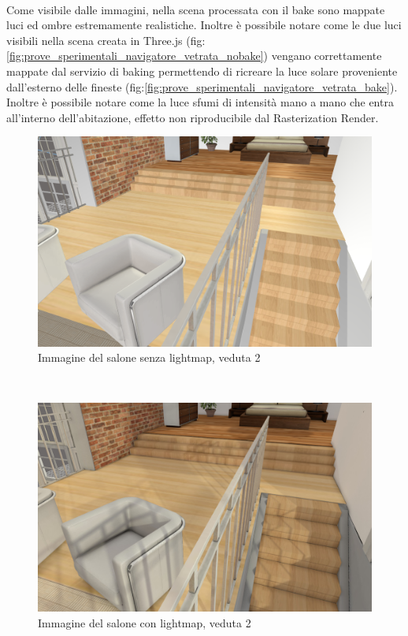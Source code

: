 \\
Come visibile dalle immagini, nella scena processata con il bake sono mappate luci ed ombre estremamente realistiche.
Inoltre è possibile notare come le due luci visibili nella scena creata in Three.js (fig: \ref{fig:prove_sperimentali_navigatore_vetrata_nobake}) vengano correttamente mappate dal servizio di baking permettendo di ricreare la luce solare proveniente dall’esterno delle fineste (fig:\ref{fig:prove_sperimentali_navigatore_vetrata_bake}).
Inoltre è possibile notare come la luce sfumi di intensità mano a mano che entra all’interno dell’abitazione, effetto non riproducibile dal Rasterization Render.
\\
\begin{figure}[htb]
 \centering
 \includegraphics[width=0.8\linewidth]{images/chapter_prove_sperimentali/salone_scale_nobake.png}\hfill
 \caption[Salone senza lightmap, veduta 2]{Immagine del salone senza lightmap, veduta 2}
 \label{fig:prove_sperimentali_navigatore_scale_nobake}
\end{figure}
\\
\begin{figure}[htb]
 \centering
 \includegraphics[width=0.8\linewidth]{images/chapter_prove_sperimentali/salone_scale_bake.png}\hfill
 \caption[Salone con lightmap, veduta 2]{Immagine del salone con lightmap, veduta 2}
 \label{fig:prove_sperimentali_navigatore_scale_bake}
\end{figure}
